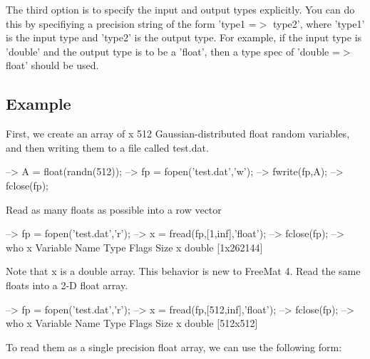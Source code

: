 The third option is to specify the input and output types explicitly. You can do this by specifiying a precision string of the form {\ttfamily 'type1 =$>$ type2'}, where {\ttfamily 'type1'} is the input type and {\ttfamily 'type2'} is the output type. For example, if the input type is {\ttfamily 'double'} and the output type is to be a {\ttfamily 'float'}, then a type spec of {\ttfamily 'double =$>$ float'} should be used.\hypertarget{variables_struct_Example}{}\subsection{Example}\label{variables_struct_Example}
First, we create an array of { x 512} Gaussian-\/distributed {\ttfamily float} random variables, and then writing them to a file called {\ttfamily test.\-dat}.


\begin{DoxyVerbInclude}
--> A = float(randn(512));
--> fp = fopen('test.dat','w');
--> fwrite(fp,A);
--> fclose(fp);
\end{DoxyVerbInclude}


Read as many floats as possible into a row vector


\begin{DoxyVerbInclude}
--> fp = fopen('test.dat','r');
--> x = fread(fp,[1,inf],'float');
--> fclose(fp);
--> who x
  Variable Name       Type   Flags             Size
              x    double                    [1x262144]
\end{DoxyVerbInclude}


Note that {\ttfamily x} is a {\ttfamily double} array. This behavior is new to Free\-Mat 4. Read the same floats into a 2-\/\-D float array.


\begin{DoxyVerbInclude}
--> fp = fopen('test.dat','r');
--> x = fread(fp,[512,inf],'float');
--> fclose(fp);
--> who x
  Variable Name       Type   Flags             Size
              x    double                    [512x512]
\end{DoxyVerbInclude}


To read them as a single precision float array, we can use the following form\-:


